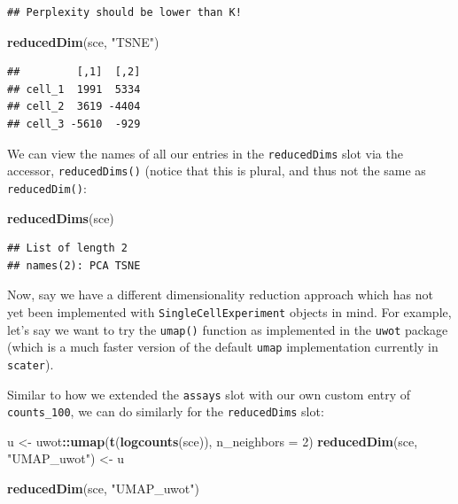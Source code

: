 \documentclass[]{book}
\newenvironment{Shaded}{\begin{snugshade}}{\end{snugshade}}
\newcommand{\DataTypeTok}[1]{\textcolor[rgb]{0.13,0.29,0.53}{#1}}
\newcommand{\DecValTok}[1]{\textcolor[rgb]{0.00,0.00,0.81}{#1}}
\newcommand{\KeywordTok}[1]{\textcolor[rgb]{0.13,0.29,0.53}{\textbf{#1}}}
\newcommand{\NormalTok}[1]{#1}
\newcommand{\OperatorTok}[1]{\textcolor[rgb]{0.81,0.36,0.00}{\textbf{#1}}}
\newcommand{\StringTok}[1]{\textcolor[rgb]{0.31,0.60,0.02}{#1}}
\begin{document}
\begin{verbatim}
## Perplexity should be lower than K!
\end{verbatim}

\begin{Shaded}
\begin{Highlighting}[]
\KeywordTok{reducedDim}\NormalTok{(sce, }\StringTok{"TSNE"}\NormalTok{)}
\end{Highlighting}
\end{Shaded}

\begin{verbatim}
##         [,1]  [,2]
## cell_1  1991  5334
## cell_2  3619 -4404
## cell_3 -5610  -929
\end{verbatim}

We can view the names of all our entries in the \texttt{reducedDims} slot via the accessor, \texttt{reducedDims()} (notice that this is plural, and thus not the same as \texttt{reducedDim()}:

\begin{Shaded}
\begin{Highlighting}[]
\KeywordTok{reducedDims}\NormalTok{(sce)}
\end{Highlighting}
\end{Shaded}

\begin{verbatim}
## List of length 2
## names(2): PCA TSNE
\end{verbatim}

Now, say we have a different dimensionality reduction approach which has not yet been implemented with \texttt{SingleCellExperiment} objects in mind. For example, let's say we want to try the \texttt{umap()} function as implemented in the \texttt{uwot} package (which is a much faster version of the default \texttt{umap} implementation currently in \texttt{scater}).

Similar to how we extended the \texttt{assays} slot with our own custom entry of \texttt{counts\_100}, we can do similarly for the \texttt{reducedDims} slot:

\begin{Shaded}
\begin{Highlighting}[]
\NormalTok{u <-}\StringTok{ }\NormalTok{uwot}\OperatorTok{::}\KeywordTok{umap}\NormalTok{(}\KeywordTok{t}\NormalTok{(}\KeywordTok{logcounts}\NormalTok{(sce)), }\DataTypeTok{n_neighbors =} \DecValTok{2}\NormalTok{)}
\KeywordTok{reducedDim}\NormalTok{(sce, }\StringTok{"UMAP_uwot"}\NormalTok{) <-}\StringTok{ }\NormalTok{u}

\KeywordTok{reducedDim}\NormalTok{(sce, }\StringTok{"UMAP_uwot"}\NormalTok{)}
\end{Highlighting}
\end{Shaded}
\end{document}
